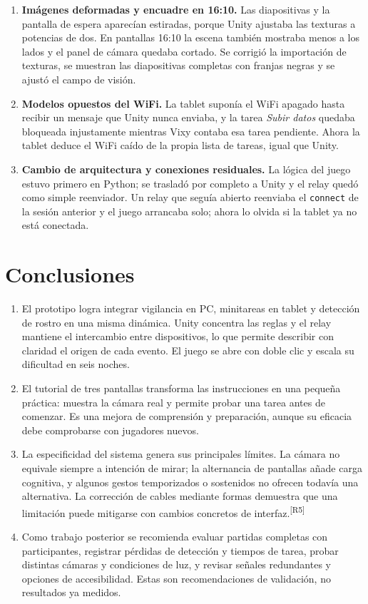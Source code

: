 \documentclass[11pt,a4paper]{article}
\newcommand{\codigo}[1]{\texttt{#1}}
\newcommand{\cita}[1]{\textsuperscript{\textcolor{Rojo}{[#1]}}}
\begin{document}
\begin{enumerate}
  \item \textbf{Imágenes deformadas y encuadre en 16:10.} Las diapositivas y la pantalla de espera aparecían estiradas, porque Unity ajustaba las texturas a potencias de dos. En pantallas 16:10 la escena también mostraba menos a los lados y el panel de cámara quedaba cortado. Se corrigió la importación de texturas, se muestran las diapositivas completas con franjas negras y se ajustó el campo de visión.
  \item \textbf{Modelos opuestos del WiFi.} La tablet suponía el WiFi apagado hasta recibir un mensaje que Unity nunca enviaba, y la tarea \textit{Subir datos} quedaba bloqueada injustamente mientras Vixy contaba esa tarea pendiente. Ahora la tablet deduce el WiFi caído de la propia lista de tareas, igual que Unity.
  \item \textbf{Cambio de arquitectura y conexiones residuales.} La lógica del juego estuvo primero en Python; se trasladó por completo a Unity y el relay quedó como simple reenviador. Un relay que seguía abierto reenviaba el \codigo{connect} de la sesión anterior y el juego arrancaba solo; ahora lo olvida si la tablet ya no está conectada.
\end{enumerate}

\section{Conclusiones}

\begin{enumerate}
  \item El prototipo logra integrar vigilancia en PC, minitareas en tablet y detección de rostro en una misma dinámica. Unity concentra las reglas y el relay mantiene el intercambio entre dispositivos, lo que permite describir con claridad el origen de cada evento. El juego se abre con doble clic y escala su dificultad en seis noches.
  \item El tutorial de tres pantallas transforma las instrucciones en una pequeña práctica: muestra la cámara real y permite probar una tarea antes de comenzar. Es una mejora de comprensión y preparación, aunque su eficacia debe comprobarse con jugadores nuevos.
  \item La especificidad del sistema genera sus principales límites. La cámara no equivale siempre a intención de mirar; la alternancia de pantallas añade carga cognitiva, y algunos gestos temporizados o sostenidos no ofrecen todavía una alternativa. La corrección de cables mediante formas demuestra que una limitación puede mitigarse con cambios concretos de interfaz.\cita{R5}
  \item Como trabajo posterior se recomienda evaluar partidas completas con participantes, registrar pérdidas de detección y tiempos de tarea, probar distintas cámaras y condiciones de luz, y revisar señales redundantes y opciones de accesibilidad. Estas son recomendaciones de validación, no resultados ya medidos.
\end{enumerate}
\end{document}
